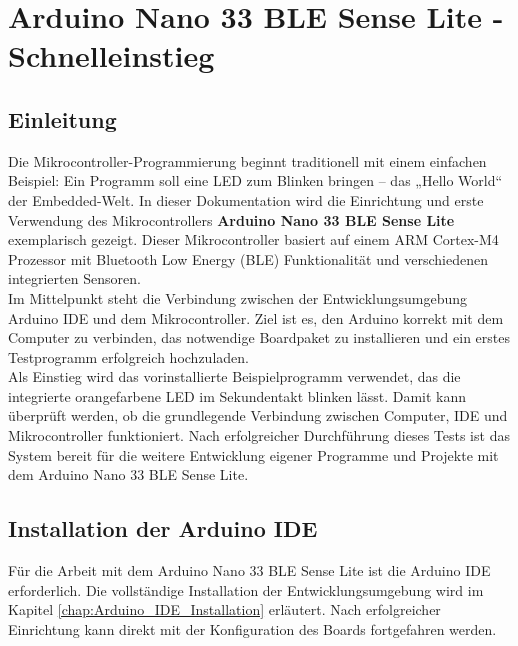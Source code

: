 %
%

\chapter{Arduino Nano 33 BLE Sense Lite - Schnelleinstieg}
\label{Arduino_Nano_33_BLE_Sense_Lite_-_Schnelleinstieg}

\section{Einleitung}

Die Mikrocontroller-Programmierung beginnt traditionell mit einem einfachen Beispiel: Ein Programm soll eine LED zum Blinken bringen – das „Hello World“ der Embedded-Welt. In dieser Dokumentation wird die Einrichtung und erste Verwendung des Mikrocontrollers \textbf{Arduino Nano 33 BLE Sense Lite} exemplarisch gezeigt. Dieser Mikrocontroller basiert auf einem ARM Cortex-M4 Prozessor mit Bluetooth Low Energy (BLE) Funktionalität und verschiedenen integrierten Sensoren.\\

Im Mittelpunkt steht die Verbindung zwischen der Entwicklungsumgebung Arduino IDE und dem Mikrocontroller. Ziel ist es, den Arduino korrekt mit dem Computer zu verbinden, das notwendige Boardpaket zu installieren und ein erstes Testprogramm erfolgreich hochzuladen.\\

Als Einstieg wird das vorinstallierte Beispielprogramm  verwendet, das die integrierte orangefarbene LED im Sekundentakt blinken lässt. Damit kann überprüft werden, ob die grundlegende Verbindung zwischen Computer, IDE und Mikrocontroller funktioniert. Nach erfolgreicher Durchführung dieses Tests ist das System bereit für die weitere Entwicklung eigener Programme und Projekte mit dem Arduino Nano 33 BLE Sense Lite.


\section{Installation der Arduino IDE}
Für die Arbeit mit dem Arduino Nano 33 BLE Sense Lite ist die Arduino IDE erforderlich. Die vollständige Installation der Entwicklungsumgebung wird im Kapitel \ref{chap:Arduino_IDE_Installation} erläutert. Nach erfolgreicher Einrichtung kann direkt mit der Konfiguration des Boards fortgefahren werden.

